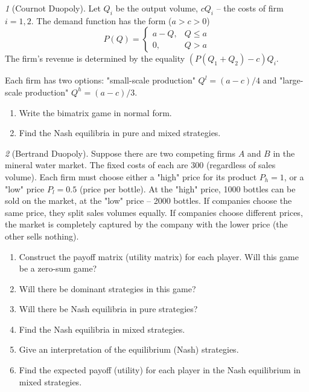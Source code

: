 \documentclass[12pt]{article}
\theoremstyle{remark}
\newtheorem{exercise}{}[subsection]
\begin{document}
\begin{exercise}[Cournot Duopoly]
Let $Q_i$ be the output volume, $cQ_i$ --
the costs of firm $i=1,2$. The demand function has the form ($a>c>0$)
\[
	P(Q)=\begin{cases}
	a-Q, & Q\leq a \\
	0, & Q>a
	\end{cases}
\]
The firm's revenue is determined by the equality $(P(Q_1+Q_2)-c)Q_i$.

Each firm has two options: "small-scale production"
$Q^l=(a-c)/4$ and "large-scale production" $Q^h=(a-c)/3$.
\begin{enumerate}
	\item Write the bimatrix game in normal form.
	\item Find the Nash equilibria in pure and mixed
	strategies.
\end{enumerate}
\end{exercise}

\begin{exercise}[Bertrand Duopoly]
Suppose there are two competing firms $A$ and $B$ in the mineral water market.
The fixed costs of each are 300
(regardless of sales volume). Each firm
must choose either a "high" price for its product $P_h=1$,
or a "low" price $P_l=0.5$ (price per bottle). At the "high" price,
1000 bottles can be sold on the market, at the "low" price -- 2000 bottles.
If companies choose the same price, they split sales volumes equally.
If companies choose different prices, the market is completely captured by the company
with the lower price (the other sells nothing).
\begin{enumerate}
	\item Construct the payoff matrix (utility matrix) for each player.
	Will this game be a zero-sum game? %
	\item Will there be dominant strategies in this game? %
	\item Will there be Nash equilibria in pure strategies? %
	\item Find the Nash equilibria in mixed strategies.
	\item Give an interpretation of the equilibrium (Nash) strategies.
	\item Find the expected payoff (utility) for each player
	in the Nash equilibrium in mixed strategies.
\end{enumerate}
\end{exercise}
\end{document}

